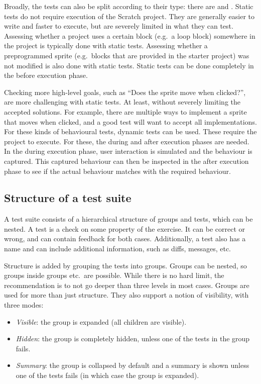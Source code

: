 \documentclass[../main]{subfiles}
\begin{document}
Broadly, the tests can also be split according to their type: there are  and .
Static tests do not require execution of the Scratch project.
They are generally easier to write and faster to execute, but are severely limited in what they can test.
Assessing whether a project uses a certain block (e.g.\ a loop block) somewhere in the project is typically done with static tests.
Assessing whether a preprogrammed sprite (e.g.\ blocks that are provided in the starter project) was not modified is also done with static tests.
Static tests can be done completely in the before execution phase.

Checking more high-level goals, such as ``Does the sprite move when clicked?'', are more challenging with static tests.
At least, without severely limiting the accepted solutions.
For example, there are multiple ways to implement a sprite that moves when clicked, and a good test will want to accept all implementations.
For these kinds of behavioural tests, dynamic tests can be used.
These require the project to execute.
For these, the during and after execution phases are needed.
In the during execution phase, user interaction is simulated and the behaviour is captured.
This captured behaviour can then be inspected in the after execution phase to see if the actual behaviour matches with the required behaviour.

\subsection{Structure of a test suite}\label{subsec:structure-of-a-test-suite2}

A test suite consists of a hierarchical structure of groups and tests, which can be nested.
A test is a check on some property of the exercise.
It can be correct or wrong, and can contain feedback for both cases.
Additionally, a test also has a name and can include additional information, such as diffs, messages, etc.

Structure is added by grouping the tests into groups.
Groups can be nested, so groups inside groups etc.\ are possible.
While there is no hard limit, the recommendation is to not go deeper than three levels in most cases.
Groups are used for more than just structure.
They also support a notion of visibility, with three modes:

\begin{itemize}[noitemsep]
    \item \emph{Visible}: the group is expanded (all children are visible).
    \item \emph{Hidden}: the group is completely hidden, unless one of the tests in the group fails.
    \item \emph{Summary}: the group is collapsed by default and a summary is shown unless one of the tests fails (in which case the group is expanded).
\end{itemize}
\end{document}
